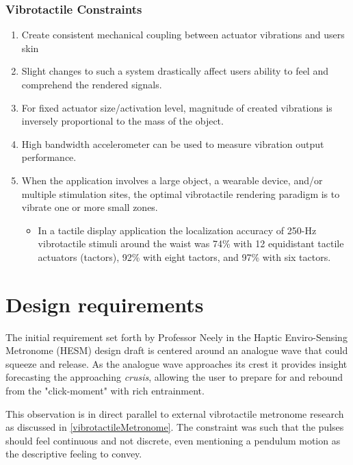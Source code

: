 \subsubsection{Vibrotactile Constraints}
\begin{enumerate}
    \item Create consistent mechanical coupling between actuator vibrations and users skin
    \item Slight changes to such a system drastically affect users ability to feel and comprehend the rendered signals.
    \item For fixed actuator size/activation level, magnitude of created vibrations is inversely proportional to the mass of the object.
    \item High bandwidth accelerometer can be used to measure vibration output performance. \cite{ignoto2017development}
    \item When the application involves a large object, a wearable device, and/or multiple stimulation sites, the optimal vibrotactile rendering paradigm is to vibrate one or more small zones. 
    \begin{itemize}
    \item In a tactile display application the localization accuracy of 250-Hz vibrotactile stimuli around the waist was 74\% with 12 equidistant tactile actuators (tactors), 92\% with eight tactors, and 97\% with six tactors.\cite{choi2013vibrotactile}	
    \end{itemize}
\end{enumerate}

\section{Design requirements}

The initial requirement set forth by Professor Neely in the Haptic Enviro-Sensing Metronome (HESM) design draft is centered around an analogue wave that could squeeze and release. As the analogue wave approaches its crest it provides insight forecasting the approaching \textit{crusis}, allowing the user to prepare for and rebound from the "click-moment" with rich entrainment. 

This observation is in direct parallel to external vibrotactile metronome research as discussed in \ref{vibrotactileMetronome}. The constraint was such that the pulses should feel continuous and not discrete, even mentioning a pendulum motion as the descriptive feeling to convey. 


